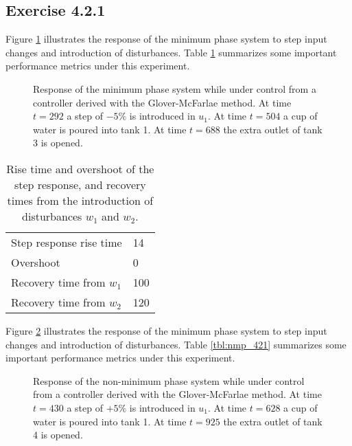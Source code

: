 \subsection*{Exercise 4.2.1}

Figure \ref{fig:mp_421} illustrates the response of the minimum phase system
to step input changes and introduction of disturbances. Table \ref{tbl:mp_421}
summarizes some important performance metrics under this experiment.

\begin{figure}[H]\centering
  
  \caption{Response of the minimum phase system while under control from a
    controller derived with the Glover-McFarlae method. At time $t = 292$ a
    step of $-5\%$ is introduced in $u_1$. At time $t = 504$ a cup of water is
    poured into tank 1. At time $t = 688$ the extra outlet of tank 3 is opened.}
  \label{fig:mp_421}
\end{figure}

\begin{table}[H]\centering
    \begin{tabular}{l|l}
    Step response rise time     & 14 \\
    Overshoot                   & 0   \\
    Recovery time from $w_1$    & 100 \\
    Recovery time from $w_2$    & 120 \\
    \end{tabular}
    \caption{Rise time and overshoot of the step response, and recovery times
      from the introduction of disturbances $w_1$ and $w_2$.}
    \label{tbl:mp_421}
\end{table}


Figure \ref{fig:nmp_421} illustrates the response of the minimum phase system
to step input changes and introduction of disturbances. Table \ref{tbl:nmp_421}
summarizes some important performance metrics under this experiment.

\begin{figure}[H]\centering
  
  \caption{Response of the non-minimum phase system while under control from a
    controller derived with the Glover-McFarlae method. At time $t = 430$ a step
    of $+5\%$ is introduced in $u_1$. At time $t = 628$ a cup of water is poured
    into tank 1. At time $t = 925$ the extra outlet of tank 4 is opened.}
  \label{fig:nmp_421}
\end{figure}

